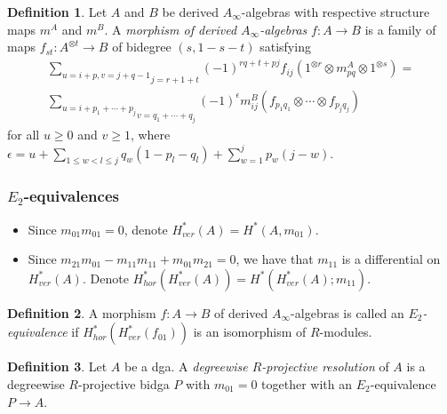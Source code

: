 \documentclass{beamer}
\theoremstyle{definition}
\newtheorem{defi}{Definition}
\begin{document}
\begin{frame}
\begin{defi}
Let $A$ and $B$ be derived $A_\infty$-algebras with respective structure maps $m^A$ and $m^B$. A \emph{morphism of derived $A_\infty$-algebras} $f:A\to B$ is a family of maps $f_{st}:A^{\otimes t}\to B$ of bidegree $(s,1-s-t)$ satisfying
\begin{align*}
\underset{j=r+1+t}{\sum_{u=i+p, v=j+q-1}}(-1)^{rq+t+pj}f_{ij}(1^{\otimes r}\otimes m_{pq}^A\otimes 1^{\otimes s})=\\
\underset{v=q_1+\cdots +q_j}{\sum_{u=i+p_1+\cdots +p_j}}(-1)^{\epsilon} m^B_{ij}(f_{p_1 q_1}\otimes\cdots\otimes f_{p_j q_j})
\end{align*}
for all $u\geq 0$ and $v\geq 1$, where
$\epsilon = u + \sum_{1\leq w < l \leq j} q_w(1-p_l-q_l)  + \sum_{w=1}^j p_w(j-w)$.
\end{defi}
\end{frame}

\begin{frame}
\frametitle{$E_2$-equivalences}
\begin{itemize}
\item<1-> Since $m_{01}m_{01}=0$, denote $H^*_{ver}(A)=H^*(A,m_{01})$. 
\item<2-> Since $m_{21}m_{01} - m_{11}m_{11} + m_{01}m_{21} = 0$, we have that $m_{11}$ is a differential on $H^*_{ver}(A)$. Denote $H^*_{hor}(H^*_{ver}(A)) = H^*(H^*_{ver}(A);m_{11})$.
\end{itemize}\pause
\pause
\begin{defi}
A morphism $f : A \to B$ of derived $A_\infty$-algebras
is called an \emph{$E_2$-equivalence} if $H^*_{hor}(H^*_{ver}(f_{01}))$
is an isomorphism of $R$-modules.
\end{defi}\pause
\begin{defi}
Let $A$ be a dga. A \emph{degreewise $R$-projective
resolution} of $A$ is a degreewise $R$-projective
bidga $P$ with $m_{01} = 0$ together with an $E_2$-equivalence $P \to A$.
\end{defi}
\end{frame}
\end{document}
